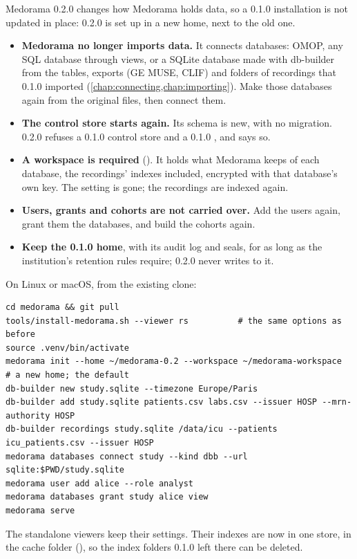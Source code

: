 Medorama 0.2.0 changes how Medorama holds data, so a 0.1.0 installation is not updated in
place: 0.2.0 is set up in a new home, next to the old one.
\begin{itemize}
\item \textbf{Medorama no longer imports data.} It connects databases: OMOP, any SQL database
  through views, or a SQLite database made with db-builder from the tables, exports (GE MUSE,
  CLIF) and folders of recordings that 0.1.0 imported (\cref{chap:connecting,chap:importing}).
  Make those databases again from the original files, then connect them.
\item \textbf{The control store starts again.} Its schema is new, with no migration. 0.2.0
  refuses a 0.1.0 control store and a 0.1.0 , and says so.
\item \textbf{A workspace is required} (). It holds what
  Medorama keeps of each database, the recordings' indexes included, encrypted with that
  database's own key. The setting  is gone; the recordings are indexed again.
\item \textbf{Users, grants and cohorts are not carried over.} Add the users again, grant them
  the databases, and build the cohorts again.
\item \textbf{Keep the 0.1.0 home}, with its audit log and seals, for as long as the
  institution's retention rules require; 0.2.0 never writes to it.
\end{itemize}
On Linux or macOS, from the existing clone:
\begin{lstlisting}[style=shell]
cd medorama && git pull
tools/install-medorama.sh --viewer rs          # the same options as before
source .venv/bin/activate
medorama init --home ~/medorama-0.2 --workspace ~/medorama-workspace   # a new home; the default
db-builder new study.sqlite --timezone Europe/Paris
db-builder add study.sqlite patients.csv labs.csv --issuer HOSP --mrn-authority HOSP
db-builder recordings study.sqlite /data/icu --patients icu_patients.csv --issuer HOSP
medorama databases connect study --kind dbb --url sqlite:$PWD/study.sqlite
medorama user add alice --role analyst
medorama databases grant study alice view
medorama serve
\end{lstlisting}
The standalone viewers keep their settings. Their indexes are now in one store,
 in the cache folder (), so the
index folders 0.1.0 left there can be deleted.

